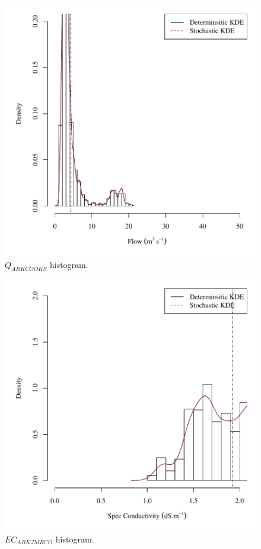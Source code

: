 \begin{center}
\begin{figure}[htbp]
	\includegraphics[width=6in]{"Figures/Results_DSR/V density qout"}
	\caption{$Q_{ARKCOOKS}$ histogram.}
\end{figure}
\end{center}
\newpage

\begin{center}
\begin{figure}[htbp]
	\includegraphics[width=6in]{"Figures/Results_DSR/V density ecin"}
	\caption{$EC_{ARKJMRCO}$ histogram.}
\end{figure}
\end{center}
\newpage

